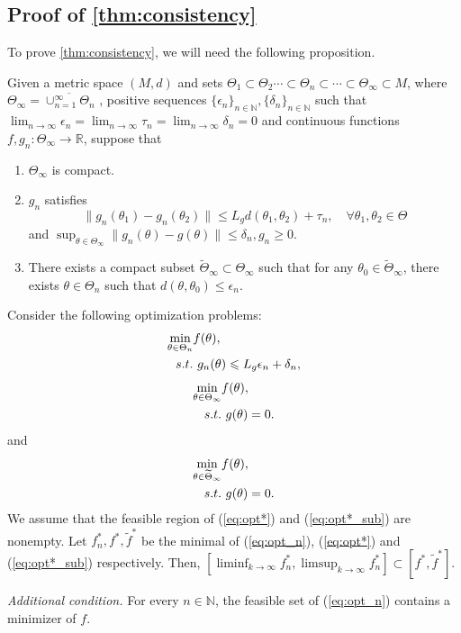 \subsection{Proof of \cref{thm:consistency}}
To prove \cref{thm:consistency}, we will need the following proposition. 
\begin{proposition}\label{prop:convg_opt}
Given a metric space $ (M,d) $ and sets $ \Theta_1\subset\Theta_2\cdots\subset\Theta_n\subset\cdots\subset \Theta_\infty \subset M$, where $\Theta_\infty = \overline{\cup_{n=1}^\infty \Theta_n}$ , positive sequences $ \{\epsilon_{n}\}_{n\in \mathbb{N}},\{\delta_{n}\}_{n\in \mathbb{N}}$ such that $ \lim _{n\rightarrow \infty } \epsilon _{n}=\lim _{n\rightarrow \infty }\tau_n=\lim _{n\rightarrow \infty } \delta_{n} =0$ and continuous functions $ f,g_{n} :\Theta_\infty \rightarrow \mathbb{R}$,  suppose that
\begin{enumerate}
    \item $\Theta_\infty$ is compact.
    \item $g_n$ satisfies 
    \begin{equation} \label{eq:aprox_lip}
        \|g_n(\theta_1) - g_n(\theta_2)\| \leqslant L_g d(\theta_1,\theta_2) + \tau_n, \quad \forall \theta_1,\theta_2\in\Theta
    \end{equation}
    and $ \sup_{\theta\in\Theta_\infty}\|g_{n}(\theta) -  g(\theta)\|\leqslant \delta_n, g_n \geqslant 0$. 
    \item There exists a compact subset $ \tilde{\Theta}_\infty \subset \Theta_\infty $ such that for any $\theta_0 \in \tilde{\Theta}_\infty$, there exists $\theta \in\Theta_n$ such that $ d(\theta,\theta_0 )\leqslant \epsilon_n.$
\end{enumerate}
 Consider the following optimization problems:
\begin{align}
\min_{\theta \in \Theta_n } & f( \theta ) , \notag\\
s.t. &\ g_{n}( \theta ) \leqslant L_g\epsilon_{n} + \delta_n, \label{eq:opt_n}
\end{align}
\begin{align}
\min_{\theta \in \Theta_\infty } & f( \theta ) ,\notag\\
s.t. &\ g( \theta ) = 0. \label{eq:opt*}
\end{align}
and 
\begin{align}
\min_{\theta \in \tilde{\Theta}_\infty } & f( \theta ) ,\notag\\
s.t. &\ g( \theta ) = 0. \label{eq:opt*_sub}
\end{align}
We assume that the feasible region of (\ref{eq:opt*}) and (\ref{eq:opt*_sub}) are nonempty. Let $ f_{n}^{*}, f^*, \tilde{f}^* $ be the minimal of (\ref{eq:opt_n}), (\ref{eq:opt*}) and (\ref{eq:opt*_sub}) respectively. Then, $ [\liminf _{k\rightarrow \infty } f_{n}^{*}, \limsup_{k\rightarrow \infty } f_{n}^{*}] \subset [f^{*}, \tilde{f}^*]$. 

\emph{Additional condition.} For every $n\in\mathbb N$, the feasible set of (\ref{eq:opt_n}) contains a minimizer of $f$.
\end{proposition}

